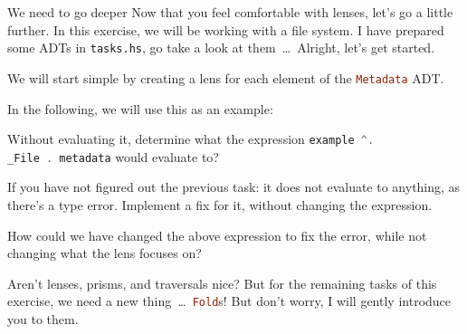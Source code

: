 \documentclass{exercise}
\newcommand\h[2][]{\lstinline[language=haskell,#1]{#2}}
\begin{document}
	\begin{exercise}{We need to go deeper}
		Now that you feel comfortable with lenses, let's go a little further. In this
		exercise, we will be working with a file system. I have prepared some ADTs in
		\texttt{tasks.hs}, go take a look at them~\ldots~Alright, let's get started.
		\begin{tasks}
			\item We will start simple by creating a lens for each element of the
				\h{Metadata} ADT.
		\end{tasks}
		In the following, we will use this as an example:
		\begin{tasks}[resume*]
			\item Without evaluating it, determine what the expression \h{example ^.
				_File . metadata} would evaluate to?
			\item If you have not figured out the previous task: it does not evaluate to
				anything, as there's a type error. Implement a fix for it, without
				changing the expression.
			\item How could we have changed the above expression to fix the error, while
				not changing what the lens focuses on?
		\end{tasks}
		Aren't lenses, prisms, and traversals nice? But for the remaining tasks of this
		exercise, we need a new thing~\ldots~\h{Fold}s! But don't worry, I will gently
		introduce you to them.


\end{exercise}
\end{document}
